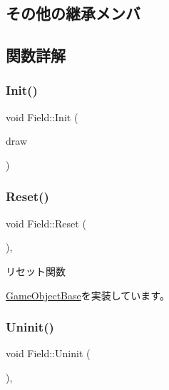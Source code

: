 \subsection*{その他の継承メンバ}


\subsection{関数詳解}
\mbox{\label{class_field_a8360ab68eaf346984eab8bce4c37c3b3}} 
\subsubsection{\texorpdfstring{Init()}{Init()}}
{\footnotesize\ttfamily void Field\+::\+Init (\begin{DoxyParamCaption}\item[{\mbox{\hyperlink{class_draw_base}{Draw\+Base}} $\ast$}]{draw }\end{DoxyParamCaption})}

\mbox{\label{class_field_a5b140074dcca821ac702da348238c6d4}} 
\subsubsection{\texorpdfstring{Reset()}{Reset()}}
{\footnotesize\ttfamily void Field\+::\+Reset (\begin{DoxyParamCaption}{ }\end{DoxyParamCaption})\hspace{0.3cm}{\ttfamily [override]}, {\ttfamily [virtual]}}



リセット関数 



\mbox{\hyperlink{class_game_object_base_a85c59554f734bcb09f1a1e18d9517dce}{Game\+Object\+Base}}を実装しています。

\mbox{\label{class_field_a6d1015e2409daa87cd00485ac1efc06b}} 
\subsubsection{\texorpdfstring{Uninit()}{Uninit()}}
{\footnotesize\ttfamily void Field\+::\+Uninit (\begin{DoxyParamCaption}{ }\end{DoxyParamCaption})\hspace{0.3cm}{\ttfamily [override]}, {\ttfamily [virtual]}}



